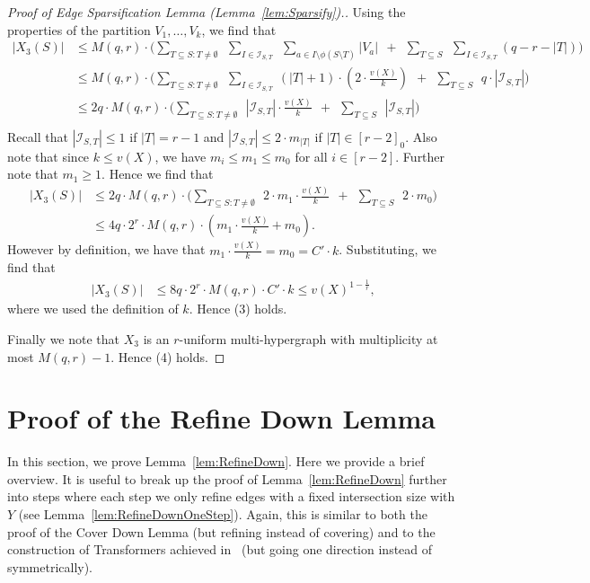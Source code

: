 \documentclass[11pt]{article}
\newcounter{i}
\theoremstyle{plain}
\theoremstyle{plain} %
\theoremstyle{definition}
\begin{document}
\begin{proof}[Proof of Edge Sparsification Lemma (Lemma~\ref{lem:Sparsify}).]
Using the properties of the partition $V_1,\ldots,V_k$, we find that
\begin{align*}
|X_3(S)| &\le M(q,r)\cdot \bigg( \sum_{T\subseteq S: T\ne\emptyset}~~\sum_{I\in \mathcal{I}_{S,T}}~~\sum_{a\in I\setminus \phi(S\setminus T)} |V_a|~~+~~\sum_{T\subseteq S}~~\sum_{I\in \mathcal{I}_{S,T}} (q-r-|T|)\bigg)\\
&\le M(q,r)\cdot \bigg( \sum_{T\subseteq S: T\ne\emptyset}~~\sum_{I\in \mathcal{I}_{S,T}}~ (|T|+1)\cdot  \left(2\cdot\frac{v(X)}{k}\right)~~+~~\sum_{T\subseteq S}~~q\cdot |\mathcal{I}_{S,T}|\bigg)\\
&\le 2q\cdot M(q,r)\cdot \bigg( \sum_{T\subseteq S: T\ne\emptyset}~~|\mathcal{I}_{S,T}|\cdot\frac{v(X)}{k}~~+~~\sum_{T\subseteq S}~~|\mathcal{I}_{S,T}|\bigg)\\
\end{align*}
Recall that $|\mathcal{I}_{S,T}|\le 1$ if $|T|=r-1$ and $|\mathcal{I}_{S,T}| \le 2\cdot m_{|T|}$ if $|T|\in [r-2]_0$. Also note that since $k\le v(X)$, we have $m_i \le m_1\le m_0$ for all $i\in [r-2]$. Further note that $m_1\ge 1$. Hence we find that
\begin{align*}
|X_3(S)|&\le 2q\cdot M(q,r)\cdot \bigg( \sum_{T\subseteq S: T\ne\emptyset}~~2\cdot m_1\cdot\frac{v(X)}{k}~~+~~\sum_{T\subseteq S}~~2\cdot m_0\bigg)\\
&\le 4q\cdot 2^r \cdot M(q,r) \cdot \left( m_1\cdot \frac{v(X)}{k} + m_0\right).
\end{align*}
However by definition, we have that $m_1\cdot \frac{v(X)}{k} = m_0 = C'\cdot k$. Substituting, we find that
\begin{align*}
|X_3(S)|&\le 8q\cdot 2^r \cdot M(q,r) \cdot C'\cdot k \le v(X)^{1-\frac{1}{r}}, 
\end{align*}
where we used the definition of $k$. Hence (3) holds.

Finally we note that $X_3$ is an $r$-uniform multi-hypergraph with multiplicity at most $M(q,r)-1$. Hence (4) holds.
\end{proof}

\section{Proof of the Refine Down Lemma}\label{s:RefineDown}

In this section, we prove Lemma~\ref{lem:RefineDown}. Here we provide a brief overview. It is useful to break up the proof of Lemma~\ref{lem:RefineDown} further into steps where each step we only refine edges with a fixed intersection size with $Y$ (see Lemma~\ref{lem:RefineDownOneStep}). Again, this is similar to both the proof of the Cover Down Lemma (but refining instead of covering) and to the construction of Transformers achieved in~\cite{GKLO16} (but going one direction instead of symmetrically).
\end{document}
